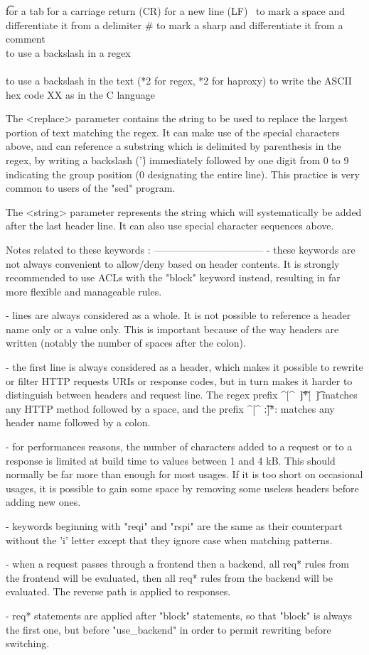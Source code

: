   \t   for a tab
  \r   for a carriage return (CR)
  \n   for a new line (LF)
  \    to mark a space and differentiate it from a delimiter
  \#   to mark a sharp and differentiate it from a comment
  \\   to use a backslash in a regex
  \\\\ to use a backslash in the text (*2 for regex, *2 for haproxy)
  \xXX to write the ASCII hex code XX as in the C language

The <replace> parameter contains the string to be used to replace the largest
portion of text matching the regex. It can make use of the special characters
above, and can reference a substring which is delimited by parenthesis in the
regex, by writing a backslash ('\') immediately followed by one digit from 0 to
9 indicating the group position (0 designating the entire line). This practice
is very common to users of the "sed" program.

The <string> parameter represents the string which will systematically be added
after the last header line. It can also use special character sequences above.

Notes related to these keywords :
---------------------------------
  - these keywords are not always convenient to allow/deny based on header
    contents. It is strongly recommended to use ACLs with the "block" keyword
    instead, resulting in far more flexible and manageable rules.

  - lines are always considered as a whole. It is not possible to reference
    a header name only or a value only. This is important because of the way
    headers are written (notably the number of spaces after the colon).

  - the first line is always considered as a header, which makes it possible to
    rewrite or filter HTTP requests URIs or response codes, but in turn makes
    it harder to distinguish between headers and request line. The regex prefix
    ^[^\ \t]*[\ \t] matches any HTTP method followed by a space, and the prefix
    ^[^ \t:]*: matches any header name followed by a colon.

  - for performances reasons, the number of characters added to a request or to
    a response is limited at build time to values between 1 and 4 kB. This
    should normally be far more than enough for most usages. If it is too short
    on occasional usages, it is possible to gain some space by removing some
    useless headers before adding new ones.

  - keywords beginning with "reqi" and "rspi" are the same as their counterpart
    without the 'i' letter except that they ignore case when matching patterns.

  - when a request passes through a frontend then a backend, all req* rules
    from the frontend will be evaluated, then all req* rules from the backend
    will be evaluated. The reverse path is applied to responses.

  - req* statements are applied after "block" statements, so that "block" is
    always the first one, but before "use_backend" in order to permit rewriting
    before switching.